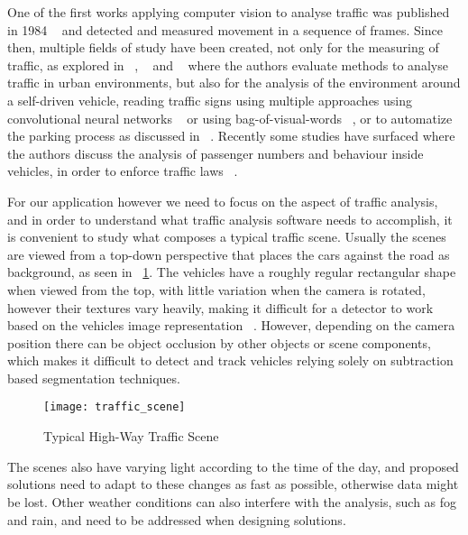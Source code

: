 One of the first works applying computer vision to analyse traffic was published in 1984 ~\cite{dickinson_image_1984} and detected and measured movement in a sequence of frames. Since then, multiple fields of study have been created, not only for the measuring of traffic, as explored in ~\cite{lira_computer-vision_2016}, ~\cite{buch_review_2011-1} and ~\cite{hashmi_analysis_2012} where the authors evaluate methods to analyse traffic in urban environments, but also for the analysis of the environment around a self-driven vehicle, reading traffic signs using multiple approaches using convolutional neural networks ~\cite{soendoro_traffic_2011} or using bag-of-visual-words ~\cite{supriyanto_unsupervised_2016}, or to automatize the parking process as discussed in ~\cite{hammoudi_self-driven_2016}. Recently some studies have surfaced where the authors discuss the analysis of passenger numbers and behaviour inside vehicles, in order to enforce traffic laws ~\cite{loce_detection_2017-1}.

For our application however we need to focus on the aspect of traffic analysis, and in order to understand what traffic analysis software needs to accomplish, it is convenient to study what composes a typical traffic scene. Usually the scenes are viewed from a top-down perspective that places the cars against the road as background, as seen in ~\ref{fig:hh_traffic}. The vehicles have a roughly regular rectangular shape when viewed from the top, with little variation when the camera is rotated, however their textures vary heavily, making it difficult for a detector to work based on the vehicles image representation ~\cite{badenas_applying_1998}. However, depending on the camera position there can be object occlusion by other objects or scene components, which makes it difficult to detect and track vehicles relying solely on subtraction based segmentation techniques.

\begin{figure}[h]
  \begin{center}
    \leavevmode
    \texttt{[image: traffic\_scene]}
    \caption{Typical High-Way Traffic Scene}
    \label{fig:hh_traffic}
  \end{center}
\end{figure}

The scenes also have varying light according to the time of the day, and proposed solutions need to adapt to these changes as fast as possible, otherwise data might be lost. Other weather conditions can also interfere with the analysis, such as fog and rain, and need to be addressed when designing solutions.

